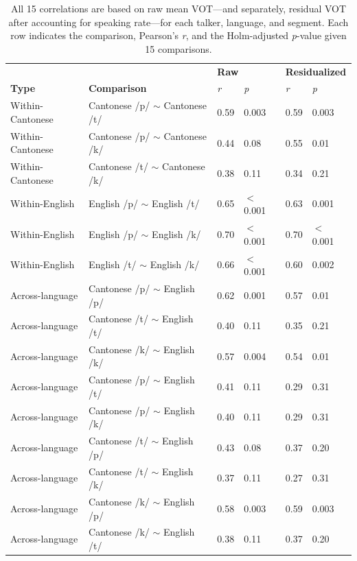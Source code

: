 \begin{table}[htbp]
  \caption{All 15 correlations are based on raw mean VOT---and separately, residual VOT after accounting for speaking rate---for each talker, language, and segment. Each row indicates the comparison, Pearson's \textit{r}, and the Holm-adjusted \textit{p}-value given 15 comparisons.}
    \label{ch4:tab:correlations}
    \centering 
    \scriptsize
    \begin{tabular}{ll|ll|ll}
      \toprule
      &   & \multicolumn{2}{l|}{\textbf{Raw}} & \multicolumn{2}{l}{\textbf{Residualized}} \\
      \textbf{Type}   & \textbf{Comparison}  & \textit{r} & \textit{p} & \textit{r} & \textit{p}  \\
    \midrule
    Within-Cantonese  & Cantonese /p/ $\sim$ Cantonese /t/    & 0.59    & 0.003       & 0.59   & 0.003    \\
    Within-Cantonese  & Cantonese /p/ $\sim$ Cantonese /k/    & 0.44    & 0.08        & 0.55   & 0.01     \\
    Within-Cantonese  & Cantonese /t/ $\sim$ Cantonese /k/    & 0.38    & 0.11        & 0.34   & 0.21     \\
    \midrule
    Within-English    & English /p/   $\sim$  English /t/     & 0.65    & $<$0.001    & 0.63   & 0.001    \\
    Within-English    & English /p/   $\sim$  English /k/     & 0.70    & $<$0.001    & 0.70   & $<$0.001 \\
    Within-English    & English /t/   $\sim$  English /k/     & 0.66    & $<$0.001    & 0.60   & 0.002    \\
    \midrule
    Across-language   & Cantonese /p/  $\sim$ English /p/     & 0.62    & 0.001       & 0.57   & 0.01    \\
    Across-language   & Cantonese /t/  $\sim$ English /t/     & 0.40    & 0.11        & 0.35   & 0.21    \\
    Across-language   & Cantonese /k/  $\sim$ English /k/     & 0.57    & 0.004       & 0.54   & 0.01    \\
    \midrule
    Across-language   & Cantonese /p/  $\sim$ English /t/     & 0.41    & 0.11        & 0.29   & 0.31    \\
    Across-language   & Cantonese /p/  $\sim$ English /k/     & 0.40    & 0.11        & 0.29   & 0.31    \\
    Across-language   & Cantonese /t/  $\sim$ English /p/     & 0.43    & 0.08        & 0.37   & 0.20    \\
    Across-language   & Cantonese /t/  $\sim$ English /k/     & 0.37    & 0.11        & 0.27   & 0.31    \\
    Across-language   & Cantonese /k/  $\sim$ English /p/     & 0.58    & 0.003       & 0.59   & 0.003   \\
    Across-language   & Cantonese /k/  $\sim$ English /t/     & 0.38    & 0.11        & 0.37   & 0.20    \\
    \bottomrule
    \end{tabular}
\end{table}

